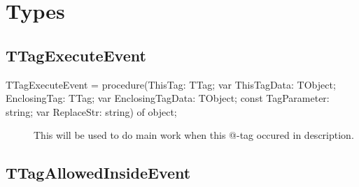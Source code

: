 \documentclass{report}
\newif\ifpdf
\begin{document}
\section{Types}
\ifpdf
\subsection*{\large{\textbf{TTagExecuteEvent}}\normalsize\hspace{1ex}\hrulefill}
\else
\subsection*{TTagExecuteEvent}
\fi
\label{PasDoc_TagManager-TTagExecuteEvent}
\begin{list}{}{
\setlength{\itemindent}{0cm}
\setlength{\listparindent}{0cm}
\setlength{\leftmargin}{\evensidemargin}
\addtolength{\leftmargin}{\tmplength}
\settowidth{\labelsep}{X}
\addtolength{\leftmargin}{\labelsep}
\setlength{\labelwidth}{\tmplength}
}
\item[\textbf{Declaration}\hfill]
\ifpdf
\begin{flushleft}
\fi
\begin{ttfamily}
TTagExecuteEvent = procedure(ThisTag: TTag; var ThisTagData: TObject; EnclosingTag: TTag; var EnclosingTagData: TObject; const TagParameter: string; var ReplaceStr: string) of object;\end{ttfamily}

\ifpdf
\end{flushleft}
\fi

\par
\item[\textbf{Description}]
 \item[\textbf{See also}]
\begin{description}
\item[\begin{ttfamily}TTag.Execute\end{ttfamily}(\ref{PasDoc_TagManager.TTag-Execute})] 
This will be used to do main work when this @{-}tag occured in description.
\end{description}


\end{list}
\ifpdf
\subsection*{\large{\textbf{TTagAllowedInsideEvent}}\normalsize\hspace{1ex}\hrulefill}
\else
\end{document}
